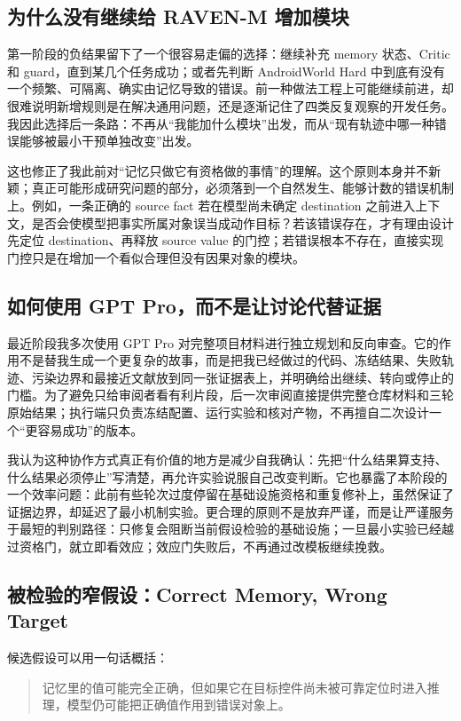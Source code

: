 \documentclass[12pt,a4paper]{ctexart}
\begin{document}
\subsection{为什么没有继续给 RAVEN-M 增加模块}

第一阶段的负结果留下了一个很容易走偏的选择：继续补充 memory 状态、Critic 和 guard，直到某几个任务成功；或者先判断 AndroidWorld Hard 中到底有没有一个频繁、可隔离、确实由记忆导致的错误。前一种做法工程上可能继续前进，却很难说明新增规则是在解决通用问题，还是逐渐记住了四类反复观察的开发任务。我因此选择后一条路：不再从“我能加什么模块”出发，而从“现有轨迹中哪一种错误能够被最小干预单独改变”出发。

这也修正了我此前对“记忆只做它有资格做的事情”的理解。这个原则本身并不新颖；真正可能形成研究问题的部分，必须落到一个自然发生、能够计数的错误机制上。例如，一条正确的 source fact 若在模型尚未确定 destination 之前进入上下文，是否会使模型把事实所属对象误当成动作目标？若该错误存在，才有理由设计先定位 destination、再释放 source value 的门控；若错误根本不存在，直接实现门控只是在增加一个看似合理但没有因果对象的模块。

\subsection{如何使用 GPT Pro，而不是让讨论代替证据}

最近阶段我多次使用 GPT Pro 对完整项目材料进行独立规划和反向审查。它的作用不是替我生成一个更复杂的故事，而是把我已经做过的代码、冻结结果、失败轨迹、污染边界和最接近文献放到同一张证据表上，并明确给出继续、转向或停止的门槛。为了避免只给审阅者看有利片段，后一次审阅直接提供完整仓库材料和三轮原始结果；执行端只负责冻结配置、运行实验和核对产物，不再擅自二次设计一个“更容易成功”的版本。

我认为这种协作方式真正有价值的地方是减少自我确认：先把“什么结果算支持、什么结果必须停止”写清楚，再允许实验说服自己改变判断。它也暴露了本阶段的一个效率问题：此前有些轮次过度停留在基础设施资格和重复修补上，虽然保证了证据边界，却延迟了最小机制实验。更合理的原则不是放弃严谨，而是让严谨服务于最短的判别路径：只修复会阻断当前假设检验的基础设施；一旦最小实验已经越过资格门，就立即看效应；效应门失败后，不再通过改模板继续挽救。

\subsection{被检验的窄假设：Correct Memory, Wrong Target}

候选假设可以用一句话概括：

\begin{quote}
记忆里的值可能完全正确，但如果它在目标控件尚未被可靠定位时进入推理，模型仍可能把正确值作用到错误对象上。
\end{quote}
\end{document}

